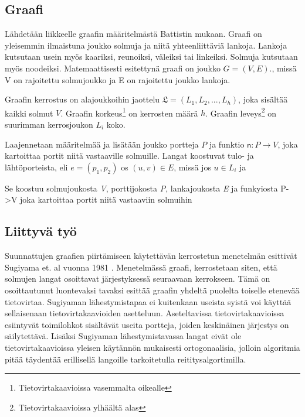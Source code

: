 \documentclass[finnish,12pt]{article}
\begin{document}
	\subsection{Graafi}

Lähdetään liikkeelle graafin määritelmästä Battistin mukaan. \cite{RefWorks:39}
Graafi on yleisemmin ilmaistuna joukko solmuja ja niitä yhteenliittäviä lankoja.
Lankoja kutsutaan usein myös kaariksi, reunoiksi, väleiksi tai linkeiksi. Solmuja kutsutaan myös noodeiksi.
Matemaattisesti esitettynä graafi on joukko $G = (V, E)$., missä V on rajoitettu solmujoukko ja E on rajoitettu joukko lankoja.

Graafin kerrostus on alajoukkoihin jaottelu $\mathfrak{L} = (L_1, L_2, ..., L_h)$, joka sisältää kaikki solmut $V$.
Graafin korkeus\footnote{Tietovirtakaavioissa vasemmalta oikealle} on kerrosten määrä $h$.
Graafin leveys\footnote{Tietovirtakaavioissa ylhäältä alas} on suurimman kerrosjoukon $L_i$ koko.

Laajennetaan määritelmää ja lisätään joukko portteja $P$ ja funktio $\mathsf{n} : P \rightarrow V$, joka kartoittaa portit niitä vastaaville solmuille.
Langat koostuvat tulo- ja lähtöporteista, eli $e = (p_1, p_2)$
os $(u, v) \in E$, missä jos $u \in L_i$ ja 

Se koostuu solmujoukosta \emph{V}, porttijokosta \emph{P}, lankajoukosta \emph{E} ja funkyiosta P->V joka kartoittaa portit niitä vastaaviin solmuihin

	\subsection{Liittyvä työ}

Suunnattujen graafien piirtämiseen käytettävän kerrostetun menetelmän esittivät Sugiyama et. al vuonna 1981 \cite{RefWorks:9}.
Menetelmässä graafi, kerrostetaan siten, että solmujen langat osoittavat järjestyksessä seuraavaan kerrokseen.
Tämä on osoittautunut luontevaksi tavaksi esittää graafin yhdeltä puolelta toiselle etenevää tietovirtaa.
Sugiyaman lähestymistapaa ei kuitenkaan useista syistä voi käyttää sellaisenaan tietovirtakaavioiden asetteluun.
Aseteltavissa tietovirtakaavioissa esiintyvät toimilohkot sisältävät useita portteja, joiden keskinäinen järjestys on säilytettävä.
Lisäksi Sugiyaman lähestymistavassa langat eivät ole tietovirtakaavioissa yleisen käytännön mukaisesti ortogonaalisia, jolloin algoritmia pitää täydentää erillisellä langoille tarkoitetulla reititysalgortimilla.
\end{document}
